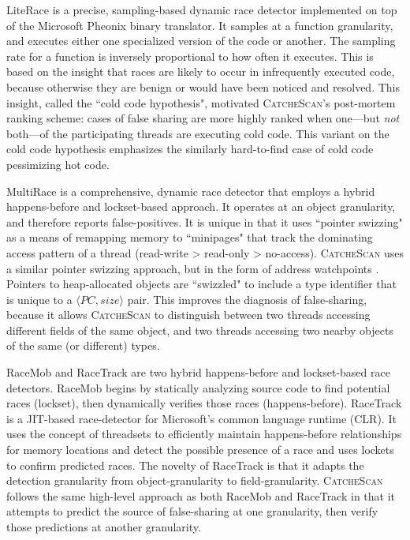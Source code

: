 \documentclass{sig-alternate}
\newcommand{\TextToolname}{CatcheScan}
\newcommand{\Toolname}{\textsc{\TextToolname{}}}
\begin{document}

LiteRace \cite{LiteRace} is a precise, sampling-based dynamic race detector implemented on top of the Microsoft
Pheonix binary translator. It samples at a function granularity, and executes either one specialized version of the
code or another. The sampling rate for a function is inversely proportional to how often it executes. This is based
on the insight that races are likely to occur in infrequently executed code, because otherwise they are benign or
would have been noticed and resolved. This insight, called the ``cold code hypothesis", motivated \Toolname's
post-mortem ranking scheme: cases of false sharing are more highly ranked when one---but \emph{not} both---of
the participating threads are executing cold code. This variant on the cold code hypothesis emphasizes the similarly
hard-to-find case of cold code pessimizing hot code.

\newcommand\TypeIdPair{$\langle PC,size \rangle$ }

MultiRace \cite{MultiRace} is a comprehensive, dynamic race detector that employs a hybrid happens-before and
lockset-based approach. It operates at an object granularity, and therefore reports false-positives. It is unique
in that it uses ``pointer swizzing" as a means of remapping memory to ``minipages" that track the dominating
access pattern of a thread (read-write > read-only > no-access). \Toolname{} uses a similar pointer swizzing approach, but
in the form of address watchpoints \cite{AddressWatchpoints}. Pointers to heap-allocated objects are ``swizzled" to
include a type identifier that is unique to a \TypeIdPair{} pair. This improves the diagnosis of false-sharing,
because it allows \Toolname{} to distinguish between two threads accessing different fields of the same object, and
two threads accessing two nearby objects of the same (or different) types.

RaceMob \cite{RaceMob} and RaceTrack \cite{RaceTrack} are two hybrid happens-before and lockset-based race detectors.
RaceMob begins by statically analyzing source code to find potential races (lockset), then dynamically verifies those races
(happens-before). RaceTrack is a JIT-based race-detector for Microsoft's common language runtime (CLR). It uses the
concept of threadsets to efficiently maintain happens-before relationships for memory locations and detect the possible
presence of a race and uses lockets to confirm predicted races. The novelty of RaceTrack is that it adapts the detection
granularity from object-granularity to field-granularity. \Toolname{} follows the same high-level approach as both RaceMob
and RaceTrack in that it attempts to predict the source of false-sharing at one granularity, then verify those predictions 
at another granularity.
\end{document}
